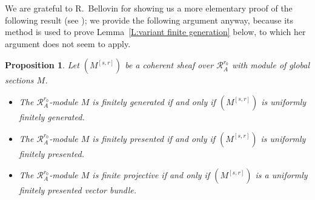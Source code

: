 \documentclass[12pt]{article}
\newtheorem{prop}[theorem]{Proposition}
\theoremstyle{definition}
\numberwithin{equation}{theorem}
\newcommand{\calR}{\mathcal{R}}
\begin{document}
We are grateful to R.~Bellovin for showing us a more elementary proof
of the following result (see \cite[\S2.2]{bellovin}); we provide the
following argument anyway, because its method is used to prove
Lemma~\ref{L:variant finite generation} below, to which her argument
does not seem to apply.

\begin{prop}
\label{P:finite-generation}
Let $(M^{[s,r]})$ be a coherent sheaf over $\calR_A^{r_0}$ with module of global sections $M$.  

\begin{itemize}
\item[(1)]
The $\calR_A^{r_0}$-module $M$ is finitely generated if and only if $(M^{[s,r]})$ is uniformly finitely generated.
\item[(2)]
The $\calR_A^{r_0}$-module $M$ is finitely presented if and only if $(M^{[s,r]})$ is uniformly finitely  presented.
\item[(3)]
The $\calR_A^{r_0}$-module $M$ is finite projective if and only if $(M^{[s,r]})$ is a uniformly finitely presented vector bundle.
\end{itemize}
\end{prop}
\end{document}
